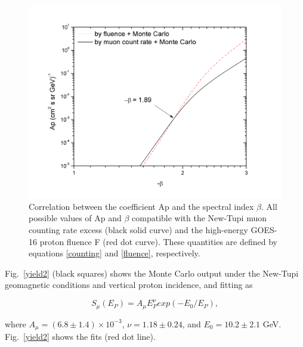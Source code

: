 \documentclass[twocolumn]{aastex63}
\begin{document}
\begin{figure}[]
\vspace*{-1.0cm}
\hspace*{-1.5cm}
\centering
\includegraphics[clip,width=0.55
\textwidth,height=0.4\textheight,angle=0.] {Fig7.png}
\vspace*{-1.0cm}
\caption{Correlation between the coefficient Ap and the spectral index $\beta$. All possible values of Ap and $\beta$ compatible with the New-Tupi muon counting rate excess
(black solid curve) and the high-energy GOES-16 proton fluence F (red dot curve). These quantities are defined by equations \ref{counting} and \ref{fluence}, respectively. 
}
\label{cruze}
\end{figure} 

Fig.~\ref{yield2} (black squares) shows the Monte Carlo output under the New-Tupi geomagnetic conditions and vertical proton incidence, and fitting as 

\begin{equation}
 S_{\mu}(E_P)=A_{\mu} E_P^{\nu}exp\left(-E_{0}/E_P \right),
 \label{yield}
\end{equation}

where $A_\mu = (6.8 \pm 1.4) \times 10^{-3}$, $\nu=1.18 \pm 0.24$, and $E_0=10.2 \pm 2.1$ GeV.  Fig.~\ref{yield2} shows the fits (red dot line).
\end{document}
